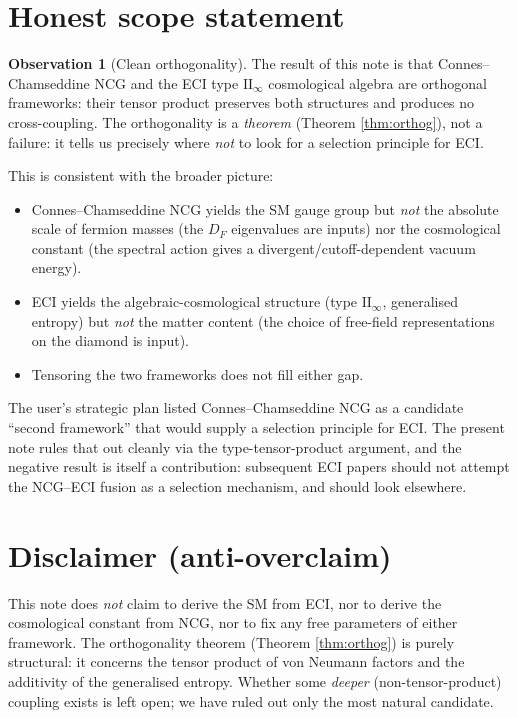 \documentclass[11pt,a4paper]{article}
\theoremstyle{definition}
\newtheorem{observation}[theorem]{Observation}
\begin{document}
\section{Honest scope statement}\label{sec:scope}

\begin{observation}[Clean orthogonality]
The result of this note is that Connes--Chamseddine NCG and the ECI
type $\mathrm{II}_\infty$ cosmological algebra are orthogonal frameworks:
their tensor product preserves both structures and produces no
cross-coupling. The orthogonality is a \emph{theorem}
(Theorem \ref{thm:orthog}), not a failure: it tells us precisely where
\emph{not} to look for a selection principle for ECI.
\end{observation}

This is consistent with the broader picture:
\begin{itemize}\setlength\itemsep{2pt}
\item Connes--Chamseddine NCG yields the SM gauge group but \emph{not}
the absolute scale of fermion masses (the $D_F$ eigenvalues are inputs)
nor the cosmological constant (the spectral action gives a
divergent/cutoff-dependent vacuum energy).
\item ECI yields the algebraic-cosmological structure (type
$\mathrm{II}_\infty$, generalised entropy) but \emph{not} the matter
content (the choice of free-field representations on the diamond is
input).
\item Tensoring the two frameworks does not fill either gap.
\end{itemize}

The user's strategic plan listed Connes--Chamseddine NCG as a candidate
``second framework'' that would supply a selection principle for ECI.
The present note rules that out cleanly via the type-tensor-product
argument, and the negative result is itself a contribution: subsequent
ECI papers should not attempt the NCG--ECI fusion as a selection
mechanism, and should look elsewhere.

\section*{Disclaimer (anti-overclaim)}

This note does \emph{not} claim to derive the SM from ECI, nor to
derive the cosmological constant from NCG, nor to fix any free
parameters of either framework. The orthogonality theorem
(Theorem \ref{thm:orthog}) is purely structural: it concerns the
tensor product of von Neumann factors and the additivity of the
generalised entropy. Whether some \emph{deeper} (non-tensor-product)
coupling exists is left open; we have ruled out only the most
natural candidate.
\end{document}
